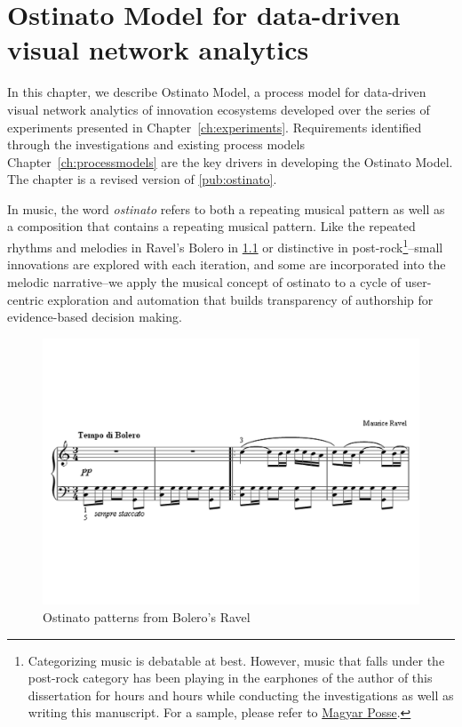 \chapter{Ostinato Model for data-driven visual network analytics}
\label{ch:ostinato}

In this chapter, we describe Ostinato Model, a process model for data-driven visual network analytics of innovation ecosystems developed over the series of experiments presented in Chapter~\ref{ch:experiments}. Requirements identified through the investigations and existing process models Chapter~\ref{ch:processmodels} are the key drivers in developing the Ostinato Model. The chapter is a revised version of \ref{pub:ostinato}.

In music, the word \emph{ostinato} refers to both a repeating musical pattern as well as a composition that contains a repeating musical pattern. Like the repeated rhythms and melodies in Ravel's Bolero in \ref{fig:bolero-ostinato} or distinctive in post-rock\footnote{Categorizing music is  debatable at best. However, music that falls under the post-rock category has been playing in the earphones of the author of this dissertation for hours and hours while conducting the investigations as well as writing this manuscript. For a sample, please refer to \href{https://www.youtube.com/watch?v=fD2HgZMdxOI}{Magyar Posse}.}--small innovations are explored with each iteration, and some are incorporated into the melodic narrative--we apply the musical concept of ostinato to a cycle of user-centric exploration and automation that builds transparency of authorship for evidence-based decision making.

\begin{figure}[htb]
\centering
\includegraphics[width=12cm]{figure/Bolero.pdf}
\caption{Ostinato patterns from Bolero's Ravel \citep{Mawer2000TheRavel}}
\label{fig:bolero-ostinato}
\end{figure}

